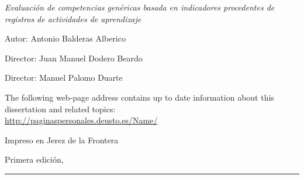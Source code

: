 
\thispagestyle{empty}

\hfill

\vfill

\medskip


\noindent
\textit{
Evaluación de competencias genéricas basada en indicadores procedentes de registros de actividades de aprendizaje
}




Autor: Antonio Balderas Alberico

Director: Juan Manuel Dodero Beardo

Director: Manuel Palomo Duarte



\vfill

\vfill

\noindent
The following web-page address contains up to date information about this dissertation and related topics: \\
\url{http://paginaspersonales.deusto.es/Name/}


\noindent
Impreso en Jerez de la Frontera

\noindent
Primera edición, 
\monthname \ \the\year

\vspace{1cm}
\hrule
\bigskip

\cleardoublepage

%
%
%
%
%
%

